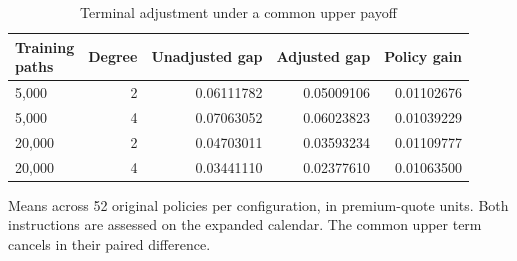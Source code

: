 \documentclass[11pt]{article}
\begin{document}
\begin{table}[htbp]
\centering\small
\caption{Terminal adjustment under a common upper payoff}\label{tab:terminal-adjustment}
\setlength{\tabcolsep}{4pt}
\begin{tabular}{lrrrr}
\toprule
\shortstack{Training\\paths} & Degree & Unadjusted gap & Adjusted gap & Policy gain \\
\midrule
5,000 & 2 & 0.06111782 & 0.05009106 & 0.01102676 \\
5,000 & 4 & 0.07063052 & 0.06023823 & 0.01039229 \\
20,000 & 2 & 0.04703011 & 0.03593234 & 0.01109777 \\
20,000 & 4 & 0.03441110 & 0.02377610 & 0.01063500 \\
\bottomrule
\end{tabular}
\par\smallskip\begin{minipage}{\textwidth}\footnotesize Means across 52 original policies per configuration, in premium-quote units. Both instructions are assessed on the expanded calendar. The common upper term cancels in their paired difference.\end{minipage}
\end{table}
\end{document}
